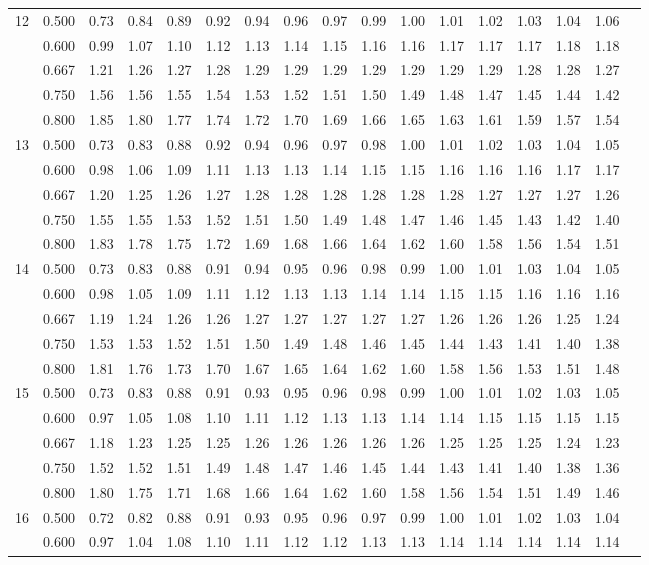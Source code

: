 {\begin{center}
\begin{tabular}{rrr@{\,}r@{\,}r@{\,}r@{\,}r@{\,}r@{\,}r@{\,}r
                   @{\,}r@{\,}r@{\,}r@{\,}r@{\,}r@{\,}r@{\,}r}
12&0.500&0.73&0.84&0.89&0.92&0.94&0.96&0.97&0.99&1.00&1.01&1.02&1.03&1.04&1.06\\
  &0.600&0.99&1.07&1.10&1.12&1.13&1.14&1.15&1.16&1.16&1.17&1.17&1.17&1.18&1.18\\
  &0.667&1.21&1.26&1.27&1.28&1.29&1.29&1.29&1.29&1.29&1.29&1.29&1.28&1.28&1.27\\
  &0.750&1.56&1.56&1.55&1.54&1.53&1.52&1.51&1.50&1.49&1.48&1.47&1.45&1.44&1.42\\
  &0.800&1.85&1.80&1.77&1.74&1.72&1.70&1.69&1.66&1.65&1.63&1.61&1.59&1.57&1.54\\
13&0.500&0.73&0.83&0.88&0.92&0.94&0.96&0.97&0.98&1.00&1.01&1.02&1.03&1.04&1.05\\
  &0.600&0.98&1.06&1.09&1.11&1.13&1.13&1.14&1.15&1.15&1.16&1.16&1.16&1.17&1.17\\
  &0.667&1.20&1.25&1.26&1.27&1.28&1.28&1.28&1.28&1.28&1.28&1.27&1.27&1.27&1.26\\
  &0.750&1.55&1.55&1.53&1.52&1.51&1.50&1.49&1.48&1.47&1.46&1.45&1.43&1.42&1.40\\
  &0.800&1.83&1.78&1.75&1.72&1.69&1.68&1.66&1.64&1.62&1.60&1.58&1.56&1.54&1.51\\
14&0.500&0.73&0.83&0.88&0.91&0.94&0.95&0.96&0.98&0.99&1.00&1.01&1.03&1.04&1.05\\
  &0.600&0.98&1.05&1.09&1.11&1.12&1.13&1.13&1.14&1.14&1.15&1.15&1.16&1.16&1.16\\
  &0.667&1.19&1.24&1.26&1.26&1.27&1.27&1.27&1.27&1.27&1.26&1.26&1.26&1.25&1.24\\
  &0.750&1.53&1.53&1.52&1.51&1.50&1.49&1.48&1.46&1.45&1.44&1.43&1.41&1.40&1.38\\
  &0.800&1.81&1.76&1.73&1.70&1.67&1.65&1.64&1.62&1.60&1.58&1.56&1.53&1.51&1.48\\
15&0.500&0.73&0.83&0.88&0.91&0.93&0.95&0.96&0.98&0.99&1.00&1.01&1.02&1.03&1.05\\
  &0.600&0.97&1.05&1.08&1.10&1.11&1.12&1.13&1.13&1.14&1.14&1.15&1.15&1.15&1.15\\
  &0.667&1.18&1.23&1.25&1.25&1.26&1.26&1.26&1.26&1.26&1.25&1.25&1.25&1.24&1.23\\
  &0.750&1.52&1.52&1.51&1.49&1.48&1.47&1.46&1.45&1.44&1.43&1.41&1.40&1.38&1.36\\
  &0.800&1.80&1.75&1.71&1.68&1.66&1.64&1.62&1.60&1.58&1.56&1.54&1.51&1.49&1.46\\
16&0.500&0.72&0.82&0.88&0.91&0.93&0.95&0.96&0.97&0.99&1.00&1.01&1.02&1.03&1.04\\
  &0.600&0.97&1.04&1.08&1.10&1.11&1.12&1.12&1.13&1.13&1.14&1.14&1.14&1.14&1.14\\

\end{tabular}
\end{center}}
